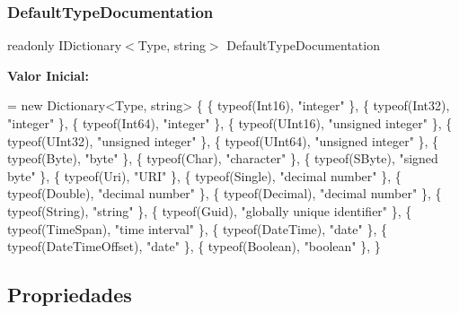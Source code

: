\subsubsection{\texorpdfstring{Default\+Type\+Documentation}{DefaultTypeDocumentation}}
{\footnotesize\ttfamily readonly I\+Dictionary$<$Type, string$>$ Default\+Type\+Documentation\hspace{0.3cm}{\ttfamily [private]}}

{\bfseries Valor Inicial\+:}
\begin{DoxyCode}
= \textcolor{keyword}{new} Dictionary<Type, string>
        \{
            \{ typeof(Int16), \textcolor{stringliteral}{"integer"} \},
            \{ typeof(Int32), \textcolor{stringliteral}{"integer"} \},
            \{ typeof(Int64), \textcolor{stringliteral}{"integer"} \},
            \{ typeof(UInt16), \textcolor{stringliteral}{"unsigned integer"} \},
            \{ typeof(UInt32), \textcolor{stringliteral}{"unsigned integer"} \},
            \{ typeof(UInt64), \textcolor{stringliteral}{"unsigned integer"} \},
            \{ typeof(Byte), \textcolor{stringliteral}{"byte"} \},
            \{ typeof(Char), \textcolor{stringliteral}{"character"} \},
            \{ typeof(SByte), \textcolor{stringliteral}{"signed byte"} \},
            \{ typeof(Uri), \textcolor{stringliteral}{"URI"} \},
            \{ typeof(Single), \textcolor{stringliteral}{"decimal number"} \},
            \{ typeof(Double), \textcolor{stringliteral}{"decimal number"} \},
            \{ typeof(Decimal), \textcolor{stringliteral}{"decimal number"} \},
            \{ typeof(String), \textcolor{stringliteral}{"string"} \},
            \{ typeof(Guid), \textcolor{stringliteral}{"globally unique identifier"} \},
            \{ typeof(TimeSpan), \textcolor{stringliteral}{"time interval"} \},
            \{ typeof(DateTime), \textcolor{stringliteral}{"date"} \},
            \{ typeof(DateTimeOffset), \textcolor{stringliteral}{"date"} \},
            \{ typeof(Boolean), \textcolor{stringliteral}{"boolean"} \},
        \}
\end{DoxyCode}


\subsection{Propriedades}
\mbox{\label{classApi3Layers_1_1Areas_1_1HelpPage_1_1ModelDescriptions_1_1ModelDescriptionGenerator_a4652be127f17b1d03648642fa509968c}} 
